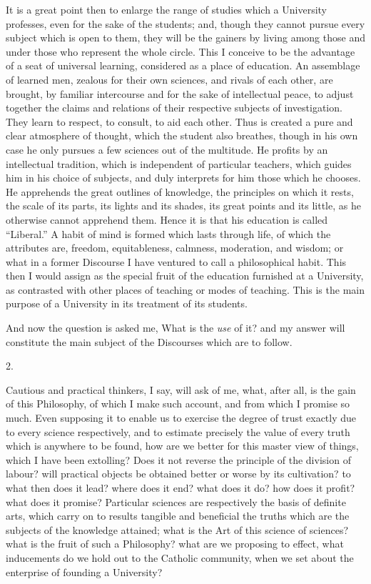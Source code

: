 It is a great point then to enlarge the range of studies which a
University professes, even for the sake of the students; and, though
they cannot pursue every subject which is open to them, they will be
the gainers by living among those and under those who represent the
whole circle. This I conceive to be the advantage of a seat of
universal learning, considered as a place of education. An assemblage
of learned men, zealous for their own sciences, and rivals of each
other, are brought, by familiar intercourse and for the sake of
intellectual peace, to adjust together the claims and relations of
their respective subjects of investigation. They learn to respect, to
consult, to aid each other. Thus is created a pure and clear
atmosphere of thought, which the student also breathes, though in his
own case he only pursues a few sciences out of the multitude. He
profits by an intellectual tradition, which is independent of
particular teachers, which guides him in his choice of subjects, and
duly interprets for him those which he chooses. He apprehends the
great outlines of knowledge, the principles on which it rests, the
scale of its parts, its lights and its shades, its great points and
its little, as he otherwise cannot apprehend them. Hence it is that
his education is called ``Liberal.'' A habit of mind is formed
which lasts through life, of which the attributes are, freedom,
equitableness, calmness, moderation, and wisdom; or what in a
former Discourse I have ventured to call a philosophical habit. This
then I would assign as the special fruit of the education furnished at
a University, as contrasted with other places of teaching or modes of
teaching. This is the main purpose of a University in its treatment of
its students.

And now the question is asked me, What is the \emph{use} of it? and
my answer will constitute the main subject of the Discourses which are
to follow.

2.

Cautious and practical thinkers, I say, will ask of me, what, after
all, is the gain of this Philosophy, of which I make such account, and
from which I promise so much. Even supposing it to enable us to
exercise the degree of trust exactly due to every science
respectively, and to estimate precisely the value of every truth which
is anywhere to be found, how are we better for this master view of
things, which I have been extolling? Does it not reverse the principle
of the division of labour? will practical objects be obtained better
or worse by its cultivation? to what then does it lead? where does it
end? what does it do? how does it profit? what does it promise?
Particular sciences are respectively the basis of definite arts, which
carry on to results tangible and beneficial the truths which are the
subjects of the knowledge attained; what is the Art of this science of
sciences? what is the fruit of such a Philosophy? what are we
proposing to effect, what inducements do we hold out to the Catholic
community, when we set about the enterprise of founding a University?


